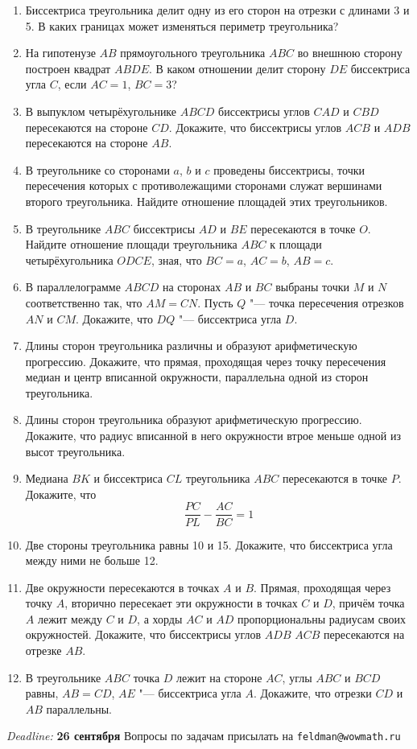 \documentclass[a4paper, 11pt]{article}
\begin{document}
\begin{enumerate}[\bf 1.]
\item  Биссектриса треугольника делит одну из его 
 сторон на отрезки с длинами 3 и 5. В каких границах может
 изменяться периметр треугольника?
\item  На гипотенузе $AB$ прямоугольного треугольника
$ABC$ во внешнюю сторону построен квадрат $ABDE$. В каком
отношении делит сторону $DE$ биссектриса угла $C$, если
$AC=1$, $BC=3$?
\item  В выпуклом четырёхугольнике $ABCD$ 
биссектрисы углов $CAD$ и $CBD$ пересекаются на стороне $CD$. 
Докажите, что биссектрисы углов $ACB$ и $ADB$ пересекаются на
стороне $AB$.
\item В треугольнике со сторонами $a$, $b$ и $c$ проведены
биссектрисы, точки пересечения которых с 
противолежащими сторонами служат вершинами второго треугольника.
Найдите отношение площадей этих треугольников.
\item В треугольнике $ABC$ биссектрисы $AD$ и $BE$ 
пересекаются в точке $O$. Найдите отношение площади 
треугольника $ABC$ к площади четырёхугольника $ODCE$, зная, что
$BC = a$, $AC = b$, $AB = c$.
\item В параллелограмме $ABCD$ на сторонах $AB$ и $BC$
выбраны точки $M$ и $N$ соответственно так, что $AM = CN$.
Пусть $Q$ "--- точка пересечения отрезков $AN$ и $CM$. Докажите,
что $DQ$ "--- биссектриса угла $D$.
\item Длины сторон треугольника различны и 
образуют арифметическую прогрессию. Докажите, что прямая, 
проходящая через точку пересечения медиан и центр 
вписанной окружности, параллельна одной из сторон треугольника.
\item Длины сторон треугольника образуют 
арифметическую прогрессию. Докажите, что радиус вписанной
в него окружности втрое меньше одной из высот 
треугольника.
\item Медиана $BK$ и биссектриса $CL$ треугольника $ABC$
пересекаются в точке $P$. Докажите, что 
\[
    \frac{PC}{PL} - \frac{AC}{BC} = 1
\]
\item  Две стороны треугольника равны 10 и 15. 
Докажите, что биссектриса угла между ними не больше 12.
\item Две окружности пересекаются в точках $A$ и $B$.
Прямая, проходящая через точку $A$, вторично пересекает
эти окружности в точках $C$ и $D$, причём точка $A$ лежит
между $C$ и $D$, а хорды $AC$ и $AD$ пропорциональны радиусам
своих окружностей. Докажите, что биссектрисы углов $ADB$
$ACB$ пересекаются на отрезке $AB$.
\item В треугольнике $ABC$ точка $D$ лежит на стороне
$AC$, углы $ABC$ и $BCD$ равны, $AB = CD$, $AE$ "--- биссектриса
угла $A$. Докажите, что отрезки $CD$ и $AB$ параллельны.
\end{enumerate}

\vfill

\noindent\rule{0pt}{0pt}\hrulefill\rule{0pt}{0pt}

\vfill

{\slshape Deadline:} {\bfseries 26 сентября} \hfill Вопросы по задачам присылать на \texttt{feldman@wowmath.ru}
\end{document}
